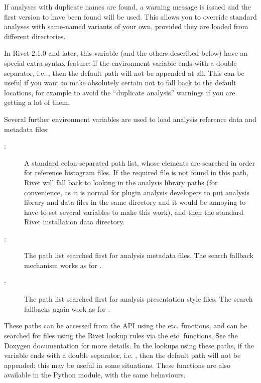 If analyses with duplicate names are found, a warning message is issued and the
first version to have been found will be used. This allows you to override
standard analyses with same-named variants of your own, provided they are loaded
from different directories.

\begin{change}
  In Rivet 2.1.0 and later, this  variable (and the
  others described below) have an special extra syntax feature: if the
  environment variable ends with a double separator, i.e. \kbd{::}, then the
  default path will not be appended at all. This can be useful if you want to
  make absolutely certain not to fall back to the default locations, for example
  to avoid the ``duplicate analysis'' warnings if you are getting a lot of them.
\end{change}

Several further environment variables are used to load analysis reference data
and metadata files:
\begin{description}
\item[:] A standard colon-separated path list, whose
  elements are searched in order for reference histogram files. If the required
  file is not found in this path, Rivet will fall back to looking in the
  analysis library paths (for convenience, as it is normal for plugin analysis
  developers to put analysis library and data files in the same directory and it
  would be annoying to have to set several variables to make this work), and
  then the standard Rivet installation data directory.
\item[:] The path list searched first for analysis
   metadata files. The search fallback mechanism works as for
  .
\item[:] The path list searched first for analysis
   presentation style files. The search fallbacks again work as for
  .
\end{description}
%

These paths can be accessed from the API using the
 etc. functions, and can be searched for files
using the Rivet lookup rules via the
 etc. functions. See the Doxygen
documentation for more details. In the lookups using these paths, if the
variable ends with a double separator, i.e. \kbd{::}, then the default path will
not be appended: this may be useful in some situations. These functions are also
available in the Python  module, with the same behaviours.



